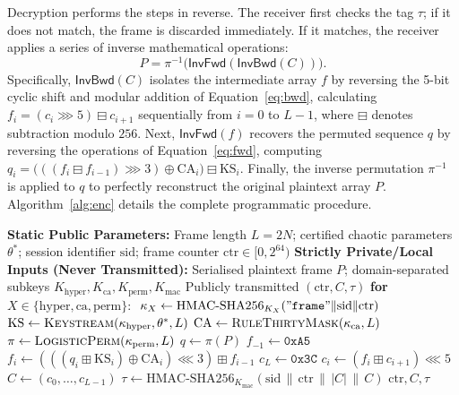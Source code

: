 \documentclass[pdflatex,sn-mathphys-num]{sn-jnl}%
\theoremstyle{thmstyleone}%
\theoremstyle{thmstyletwo}%
\theoremstyle{thmstylethree}%
\begin{document}
Decryption performs the steps in reverse. The receiver first checks the tag $\tau$; if it does not match, the frame is discarded immediately. If it matches, the receiver applies a series of inverse mathematical operations:
\begin{equation}
P = \pi^{-1}\big(\mathsf{InvFwd}(\mathsf{InvBwd}(C))\big).
\label{eq:dec}
\end{equation}
Specifically, $\mathsf{InvBwd}(C)$ isolates the intermediate array $f$ by reversing the 5-bit cyclic shift and modular addition of Equation~\eqref{eq:bwd}, calculating $f_i = (c_i \ggg 5) \boxminus c_{i+1}$ sequentially from $i=0$ to $L-1$, where $\boxminus$ denotes subtraction modulo $256$. Next, $\mathsf{InvFwd}(f)$ recovers the permuted sequence $q$ by reversing the operations of Equation~\eqref{eq:fwd}, computing $q_i = \big(((f_i \boxminus f_{i-1}) \ggg 3) \oplus \mathrm{CA}_i\big) \boxminus \mathrm{KS}_i$. Finally, the inverse permutation $\pi^{-1}$ is applied to $q$ to perfectly reconstruct the original plaintext array $P$. Algorithm~\ref{alg:enc} details the complete programmatic procedure.

\begin{algorithm}[htbp]
\caption{Audio frame encryption (Layers 2--5)}
\label{alg:enc}
\begin{algorithmic}[1]
\Require
    \Statex \textbf{Static Public Parameters:} Frame length $L=2N$; certified chaotic parameters $\theta^\ast$; session identifier $\mathrm{sid}$; frame counter $\mathrm{ctr}\in[0,2^{64})$
    \Statex \textbf{Strictly Private/Local Inputs (Never Transmitted):} Serialised plaintext frame $P$; domain-separated subkeys $K_{\mathrm{hyper}}, K_{\mathrm{ca}}, K_{\mathrm{perm}}, K_{\mathrm{mac}}$
\Ensure Publicly transmitted $(\mathrm{ctr}, C, \tau)$
\State \textbf{for} $X\in\{\mathrm{hyper},\mathrm{ca},\mathrm{perm}\}$: $\ \kappa_X \gets \mathrm{HMAC\text{-}SHA256}_{K_X}(\mathtt{"frame"}\|\mathrm{sid}\|\mathrm{ctr})$ 
\State $\mathrm{KS} \gets \textsc{Keystream}(\kappa_{\mathrm{hyper}},\theta^\ast,L)$ 
\State $\mathrm{CA} \gets \textsc{RuleThirtyMask}(\kappa_{\mathrm{ca}},L)$
\State $\pi \gets \textsc{LogisticPerm}(\kappa_{\mathrm{perm}},L)$
\State $q \gets \pi(P)$ 
\State $f_{-1}\gets\texttt{0xA5}$
  \State $f_i \gets (((q_i \boxplus \mathrm{KS}_i)\oplus \mathrm{CA}_i)\lll 3)\boxplus f_{i-1}$
\EndFor
\State $c_L\gets\texttt{0x3C}$
  \State $c_i \gets (f_i \boxplus c_{i+1})\lll 5$
\EndFor
\State $C \gets (c_0,\dots,c_{L-1})$
\State $\tau \gets \mathrm{HMAC\text{-}SHA256}_{K_{\mathrm{mac}}}(\mathrm{sid}\,\|\,\mathrm{ctr}\,\|\,|C|\,\|\,C)$ 
\State \Return $\mathrm{ctr}, C,\tau$
\end{algorithmic}
\end{algorithm}
\end{document}
